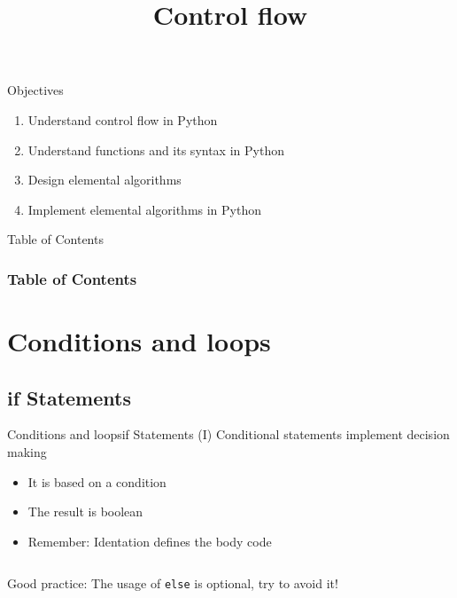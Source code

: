 \documentclass[10pt,compress]{beamer} %
\title[Control flow]{Control flow}
\author{}
\institute{\asignatura}
\date{}
\begin{document}
{\titlepageBlue
    \begin{frame}
        \titlepage
    \end{frame}
}

\begin{frame}[plain]{}
	\begin{block}{Objectives}
		\begin{enumerate}
		\item Understand control flow in Python
		\item Understand functions and its syntax in Python
		\item Design elemental algorithms
		\item Implement elemental algorithms in Python
		\end{enumerate}
	\end{block}
\end{frame}


{
\eliminarNavegacion
\begin{frame}[shrink]{Table of Contents}
 \frametitle{Table of Contents}
 \tableofcontents
\end{frame}
}

\section{Conditions and loops}
\subsection{if Statements}

\begin{frame}{Conditions and loops}{if Statements (I)}
	Conditional statements implement decision making
	\begin{itemize}
			\item It is based on a condition
			\item The result is boolean
			\item Remember: Identation defines the body code
	\end{itemize}

	\vspace{-0.2cm}
    \begin{columns}
		\begin{block}{}
		\vspace{-0.2cm}
		
		\vspace{-0.2cm}
		\end{block}
	\end{columns}
	\begin{center} \alert{Good practice: The usage of \texttt{else} is optional, try to avoid it!}\end{center}
\end{frame}
\end{document}
